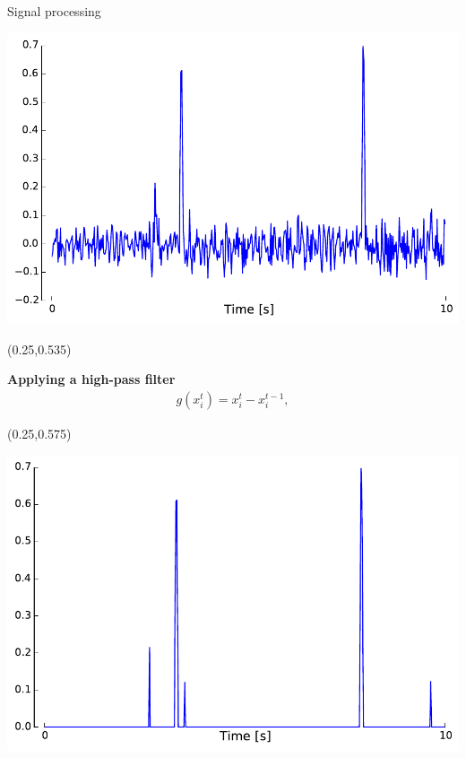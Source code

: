 \documentclass[final]{beamer}
\newenvironment{shaded2}{%
  \def\FrameCommand{\fboxsep=\FrameSep \colorbox{blue!20}}%
  \MakeFramed {\FrameRestore}}%
 {\endMakeFramed}
\begin{document}
\begin{frame}{}
\begin{textblock}{0.485}
\begin{block}{Signal processing \phantom{p}}
\begin{textblock}{0.485}
\begin{minipage}{0.48\linewidth}
\begin{shaded}
\begin{center}
\includegraphics[width=0.85\linewidth]{images/diff_curve.pdf}
\end{center}
\end{shaded}
\end{minipage}
\end{textblock}

\begin{textblock}{0.485}(0.25,0.535)
\begin{minipage}{0.48\linewidth}
\begin{shaded}
\vspace{3pt}
{\color{lightgreen} \textbf{Applying a high-pass filter}}
\begin{align*}
g(x^{t}_{i}) = x^{t}_i - x^{t-1}_i,
\end{align*}
\vspace{5pt}
\end{shaded}
\end{minipage}
\end{textblock}

\begin{textblock}{0.485}(0.25,0.575)
\begin{minipage}{0.48\linewidth}
\begin{shaded2}
\begin{center}

\includegraphics[width=0.85\linewidth]{images/threshold_curve.pdf}
\end{center}


\end{shaded2}
\end{minipage}
\end{textblock}
\end{block}
\end{textblock}
\end{frame}
\end{document}
